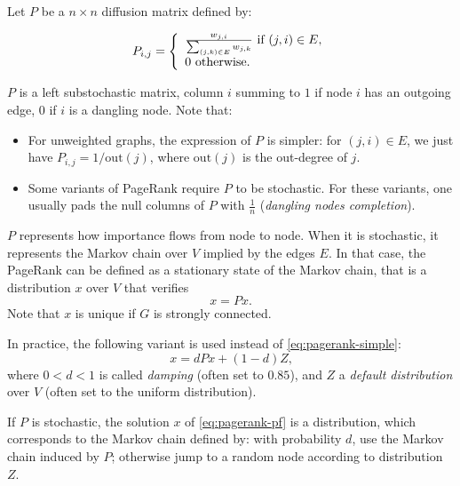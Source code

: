 \documentclass{llncs}
\begin{document}
Let $ P $ be a $ n\times n $ diffusion matrix defined by:

\begin{equation}
P_{i,j}=\left\{ 
\begin{array}{l}
\frac{w_{j,i}}{\sum_{(j,k)\in E}w_{j,k}} \text{ if $ (j,i) \in E$,}\\
0 \text{ otherwise.}
\end{array}
\right.
\label{eq:def-p}
\end{equation}


$ P $ is a left substochastic matrix, column $ i $ summing to $ 1 $ if node $ i $ has an outgoing edge, $ 0 $ if $ i $ is a dangling node. Note that:
\begin{itemize}
\item For unweighted graphs, the expression of $ P $ is simpler: for $ (j,i)\in E $, we just have $ P_{i,j}=1/\textrm{out}(j) $, where $\textrm{out}(j) $ is the out-degree of $ j $.
\item Some variants of PageRank require $ P $ to be stochastic.
For these variants, one usually pads the null columns of $ P $ with $ \frac{1}{n} $ (\emph{dangling nodes completion}).
\end{itemize}


$ P $ represents how importance flows from node to node. When it is stochastic, it represents the Markov chain over $ V $ implied by the edges $ E $. In that case, the PageRank can be defined as a stationary state of the Markov chain, that is a distribution $ x $ over $ V $ that verifies
\begin{equation}
x=Px\text{.}
\label{eq:pagerank-simple}
\end{equation}
Note that $ x $ is unique if $ G $ is strongly connected.



In practice, the following variant is used instead of \eqref{eq:pagerank-simple}:
\begin{equation}
x=dPx+(1-d)Z\text{,}
\label{eq:pagerank-pf}
\end{equation}
\noindent where $ 0<d<1 $ is called \emph{damping} (often set to $ 0.85 $), and $ Z $ a \emph{default distribution} over $ V $ (often set to the uniform distribution).

If $ P $ is stochastic, the solution $ x $ of \eqref{eq:pagerank-pf} is a distribution, which corresponds to the Markov chain defined by: with probability $ d $, use the Markov chain induced by $ P $; otherwise jump to a random node according to distribution $ Z $.
\end{document}

